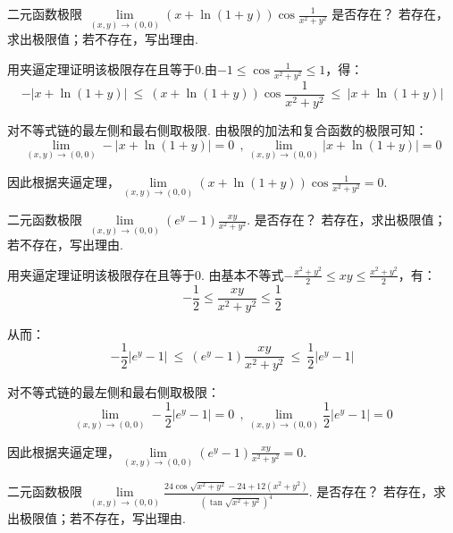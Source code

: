 \begin{example}[2022 A卷]
\label{ex:ch06-05}
二元函数极限
$\lim\limits_{\scriptscriptstyle{(x,y)\to (0,0)} } \left(x + \ln(1+y)\right) \cos \frac{1}{x^2+y^2}$
是否存在？
若存在，求出极限值；若不存在，写出理由.
\end{example}

\begin{solution}
用夹逼定理证明该极限存在且等于$0$.由$-1 \le \cos \frac{1}{x^2 + y^2} \le 1$，得：
$$
- \left| x + \ln(1+y) \right|
~\le~
\left(x + \ln(1+y)\right) \cos \frac{1}{x^2+y^2}
~\le~
\left| x + \ln(1+y) \right|
$$\par
对不等式链的最左侧和最右侧取极限. 由极限的加法和复合函数的极限可知：
$$
\lim\limits_{\scriptscriptstyle{(x,y)\to (0,0)} } -\left| x + \ln(1+y) \right| = 0~~,
\lim\limits_{\scriptscriptstyle{(x,y)\to (0,0)} } \left| x + \ln(1+y) \right| = 0
$$\par
因此根据夹逼定理，$\lim\limits_{\scriptscriptstyle{(x,y)\to (0,0)} } \left(x + \ln(1+y)\right) \cos \frac{1}{x^2+y^2} = 0$.
\end{solution}

\begin{example}[2022 B卷]
\label{ex:ch06-06}
二元函数极限
$\lim\limits_{\scriptscriptstyle{(x,y)\to (0,0)} } \left(e^y - 1\right) \frac{xy}{x^2 + y^2}$.
是否存在？
若存在，求出极限值；若不存在，写出理由.
\end{example}

\begin{solution}
用夹逼定理证明该极限存在且等于$0$. 由基本不等式$- \frac{x^2 + y^2}{2} \le xy \le \frac{x^2 + y^2}{2}$，有：
$$
-\frac{1}{2} \le \frac{xy}{x^2 + y^2}  \le  \frac{1}{2}
$$\par
从而：
$$
-\frac{1}{2}|e^y - 1|
~\le~
\left(e^y - 1\right)\frac{xy}{x^2 + y^2}
~\le~
\frac{1}{2}|e^y - 1|
$$\par
对不等式链的最左侧和最右侧取极限：
$$
\lim\limits_{\scriptscriptstyle{(x,y)\to (0,0)} } -\frac{1}{2}|e^y - 1|  = 0~~,
\lim\limits_{\scriptscriptstyle{(x,y)\to (0,0)} } \frac{1}{2}|e^y - 1| = 0
$$

因此根据夹逼定理，$\lim\limits_{\scriptscriptstyle{(x,y)\to (0,0)} } \left(e^y - 1\right) \frac{xy}{x^2 + y^2} = 0$.
\end{solution}

\begin{example}[2022 A卷]
\label{ex:ch06-07}
二元函数极限
$\lim\limits_{\scriptscriptstyle{(x,y)\to (0,0)} } \frac{24\cos \sqrt{x^2 + y^2} - 24 + 12(x^2 + y^2)}{( \tan \sqrt{x^2 + y^2})^4}$.
是否存在？
若存在，求出极限值；若不存在，写出理由.
\end{example}

